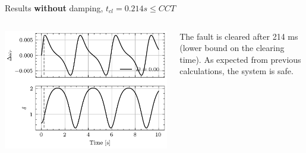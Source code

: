 \begin{frame} {Results  \textbf{without} damping, $t_{cl} = 0.214 s \leq CCT$}
\begin{columns}
    \begin{column}{0.55\textwidth}
       
        \begin{center}
        \includegraphics[width=0.9\linewidth]{images/P-dynamics.png}
        \end{center}
    \end{column}
    \begin{column}{0.45\textwidth}
        The fault is cleared after 214 ms (lower bound on the clearing time). As expected from previous calculations, the system is safe.
    \end{column}
\end{columns}
\end{frame}

